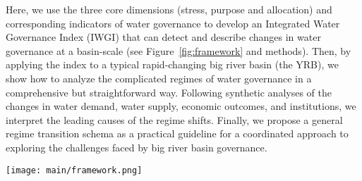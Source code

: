 Here, we use the three core dimensions (stress, purpose and allocation) and corresponding indicators of water governance to develop an Integrated Water Governance Index (IWGI) that can detect and describe changes in water governance at a basin-scale (see Figure~\ref{fig:framework} and methods).
Then, by applying the index to a typical rapid-changing big river basin (the YRB), we show how to analyze the complicated regimes of water governance in a comprehensive but straightforward way.
Following synthetic analyses of the changes in water demand, water supply, economic outcomes, and institutions, we interpret the leading causes of the regime shifts.
Finally, we propose a general regime transition schema as a practical guideline for a coordinated approach to exploring the challenges faced by big river basin governance.

\begin{figure*}%
	\centering
	\texttt{[image: main/framework.png]}
	\caption{
		A framework for identifying the water governance regimes and transitions of a hydrosocial cycle.
		\textbf{A:} water governance has three key dimensions (stress, purpose and allocation), each of which has two potential directions (denoted in red) when changing. (1) ``stress'' of water shifts between scarcity and abundance; (2) weighting ``purpose'' of water between consumptive services or non-consumptive uses; (3) ``allocation'' changes between balanced or lopsided.
		\textbf{B:} along with a transition of hydrosocial water cycle, water governance shifts in line with the three dimensions. Combining corresponding indicators, an abrupt change of the IWGI thus indicates a regime shift in water governance.
	}
	\label{fig:framework}
\end{figure*}
